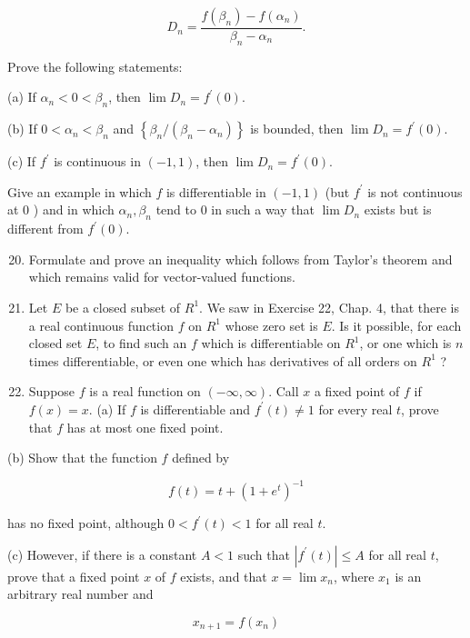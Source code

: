 \documentclass[10pt]{article}
\begin{document}
$$
D_{n}=\frac{f\left(\beta_{n}\right)-f\left(\alpha_{n}\right)}{\beta_{n}-\alpha_{n}} .
$$

Prove the following statements:

(a) If $\alpha_{n}<0<\beta_{n}$, then $\lim D_{n}=f^{\prime}(0)$.

(b) If $0<\alpha_{n}<\beta_{n}$ and $\left\{\beta_{n} /\left(\beta_{n}-\alpha_{n}\right)\right\}$ is bounded, then $\lim D_{n}=f^{\prime}(0)$.

(c) If $f^{\prime}$ is continuous in $(-1,1)$, then $\lim D_{n}=f^{\prime}(0)$.

Give an example in which $f$ is differentiable in $(-1,1)$ (but $f^{\prime}$ is not continuous at 0 ) and in which $\alpha_{n}, \beta_{n}$ tend to 0 in such a way that $\lim D_{n}$ exists but is different from $f^{\prime}(0)$.

\begin{enumerate}
  \setcounter{enumi}{19}
  \item Formulate and prove an inequality which follows from Taylor's theorem and which remains valid for vector-valued functions.

  \item Let $E$ be a closed subset of $R^{1}$. We saw in Exercise 22, Chap. 4, that there is a real continuous function $f$ on $R^{1}$ whose zero set is $E$. Is it possible, for each closed set $E$, to find such an $f$ which is differentiable on $R^{1}$, or one which is $n$ times differentiable, or even one which has derivatives of all orders on $R^{1}$ ?

  \item Suppose $f$ is a real function on $(-\infty, \infty)$. Call $x$ a fixed point of $f$ if $f(x)=x$. (a) If $f$ is differentiable and $f^{\prime}(t) \neq 1$ for every real $t$, prove that $f$ has at most one fixed point.

\end{enumerate}

(b) Show that the function $f$ defined by

$$
f(t)=t+\left(1+e^{t}\right)^{-1}
$$

has no fixed point, although $0<f^{\prime}(t)<1$ for all real $t$.

(c) However, if there is a constant $A<1$ such that $\left|f^{\prime}(t)\right| \leq A$ for all real $t$, prove that a fixed point $x$ of $f$ exists, and that $x=\lim x_{n}$, where $x_{1}$ is an arbitrary real number and

$$
x_{n+1}=f\left(x_{n}\right)
$$
\end{document}
